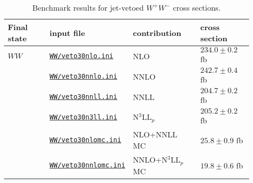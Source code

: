 \renewcommand{\arraystretch}{1.05}
\begin{table}
\begin{tabular}{llll}
\hline
Final state & input file & contribution & cross section \\
\hline
$WW$
     & \href{\mcfmprocs/Files61/jetveto/veto30nlo.ini}{\texttt{WW/veto30nlo.ini}}       & NLO                 & $234.0 \pm 0.2$ fb \\
     & \href{\mcfmprocs/Files61/jetveto/veto30nnlo.ini}{\texttt{WW/veto30nnlo.ini}}      & NNLO                & $242.7 \pm 0.4$ fb \\
     & \href{\mcfmprocs/Files61/jetveto/veto30nnll.ini}{\texttt{WW/veto30nnll.ini}}      & NNLL                & $204.7 \pm 0.2$ fb \\
     & \href{\mcfmprocs/Files61/jetveto/veto30n3ll.ini}{\texttt{WW/veto30n3ll.ini}}      & N$^3$LL$_p$         & $205.2 \pm 0.2$ fb \\
     & \href{\mcfmprocs/Files61/jetveto/veto30nlomc.ini}{\texttt{WW/veto30nlomc.ini}}    & NLO+NNLL MC         & $25.8 \pm 0.9$ fb \\
     & \href{\mcfmprocs/Files61/jetveto/veto30nnlomc.ini}{\texttt{WW/veto30nnlomc.ini}}  & NNLO+N$^3$LL$_p$ MC & $19.8 \pm 0.6$ fb \\[2pt]
\hline
\end{tabular}
\caption{Benchmark results for jet-vetoed $W^+W^-$ cross sections.}
\label{table:jetveto_WW}
\end{table}
\renewcommand{\arraystretch}{1.0}
